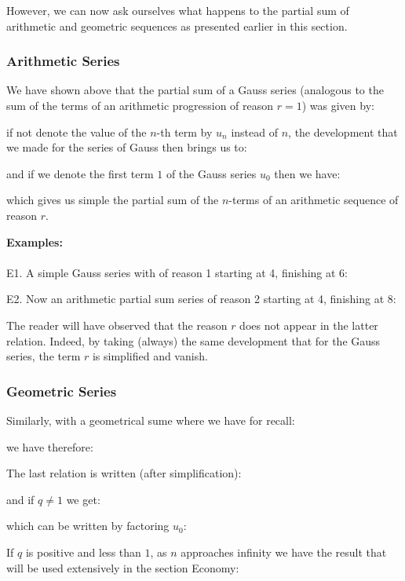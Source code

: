 	However, we can now ask ourselves what happens to the partial sum of arithmetic and geometric sequences as presented earlier in this section.
	\subsubsection{Arithmetic Series}
	We have shown above that the partial sum of a Gauss series (analogous to the sum of the terms of an arithmetic progression of reason $r = 1$) was given by:
	
	if not denote the value of the $n$-th term by $u_n$ instead of $n$, the development that we made for the series of Gauss then brings us to:
	
	and if we denote the first term $1$ of the Gauss series $u_0$ then we have:
	
	which gives us simple the partial sum of the $n$-terms of an arithmetic sequence of reason $r$.
	\begin{tcolorbox}[colframe=black,colback=white,sharp corners]
	\textbf{{\Large {}}Examples:}\\\\
	E1. A simple Gauss series with of reason 1 starting at 4, finishing at 6:
	
	E2. Now an arithmetic partial sum series of reason 2 starting at 4, finishing at 8:
	
	\end{tcolorbox}
	\begin{tcolorbox}[title=Remark,colframe=black,arc=10pt]
	The reader will have observed that the reason $r$ does not appear in the latter relation. Indeed, by taking (always) the same development that for the Gauss series, the term $r$ is simplified and vanish.
	\end{tcolorbox}
	
	\subsubsection{Geometric Series}
	Similarly, with a geometrical sume where we have for recall:
	
	we have therefore:
	
	The last relation is written (after simplification):
	
	and if $q\neq 1$ we get:
	
	which can be written by factoring $u_0$:
	
	If $q$ is positive and less than $1$, as $n$ approaches infinity we have the result that will be used extensively in the section Economy:
	
